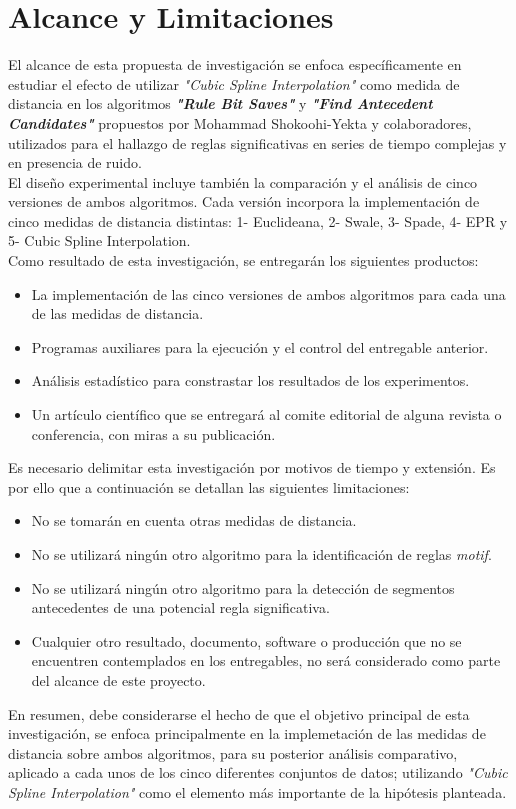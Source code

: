 \section{\textbf{Alcance y Limitaciones}}
El alcance de esta propuesta de investigaci\'on se enfoca espec\'ificamente en estudiar el efecto de utilizar \textit{"Cubic Spline Interpolation"} como medida de distancia en los algoritmos \textit{\textbf{"Rule Bit Saves"}} y \textit{\textbf{"Find Antecedent Candidates"}} propuestos por Mohammad Shokoohi-Yekta y colaboradores, utilizados para el hallazgo de reglas significativas en series de tiempo complejas y en presencia de ruido.\\
El dise\~no experimental incluye tambi\'en la comparaci\'on y el an\'alisis de cinco versiones de ambos algoritmos. Cada versi\'on incorpora la implementaci\'on de cinco medidas de distancia distintas: 1- Euclideana, 2- Swale, 3- Spade, 4- EPR y 5- Cubic Spline Interpolation.\\
Como resultado de esta investigaci\'on, se entregar\'an los siguientes productos:
\begin{itemize}
\item La implementaci\'on de las cinco versiones de ambos algoritmos para cada una de las medidas de distancia.
\item Programas auxiliares para la ejecuci\'on y el control del entregable anterior.
\item An\'alisis estad\'istico para constrastar los resultados de los experimentos.
\item Un art\'iculo cient\'ifico que se entregar\'a al comite editorial de alguna revista o conferencia, con miras a su publicaci\'on.
\end{itemize}
Es necesario delimitar esta investigaci\'on por motivos de tiempo y extensi\'on. Es por ello que a continuaci\'on se detallan las siguientes limitaciones:
\begin{itemize}
\item No se tomar\'an en cuenta otras medidas de distancia.
\item No se utilizar\'a ning\'un otro algoritmo para la identificaci\'on de reglas \textit{motif}.
\item No se utilizar\'a ning\'un otro algoritmo para la detecci\'on de segmentos antecedentes de una potencial regla significativa.
\item Cualquier otro resultado, documento, software o producci\'on que no se encuentren contemplados en los entregables, no ser\'a considerado como parte del alcance de este proyecto.
\end{itemize}
En resumen, debe considerarse el hecho de que el objetivo principal de esta investigaci\'on, se enfoca principalmente en la implemetaci\'on de las medidas de distancia sobre ambos algoritmos, para su posterior an\'alisis comparativo, aplicado a cada unos de los cinco diferentes conjuntos de datos; utilizando \textit{"Cubic Spline Interpolation"} como el elemento m\'as importante de la hip\'otesis planteada.